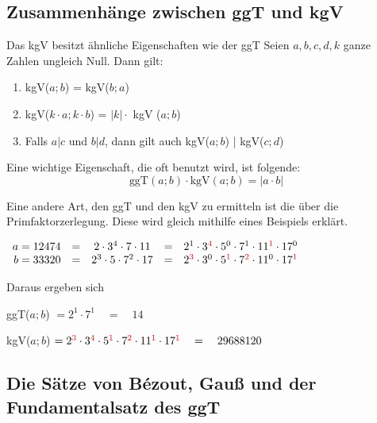 \documentclass[main.tex]{subfiles}
\begin{document}
\subsection{Zusammenhänge zwischen ggT und kgV}


\begin{Theorem}
	Das kgV besitzt ähnliche Eigenschaften wie der ggT
	Seien $a,b,c,d,k$ ganze Zahlen ungleich Null. Dann gilt:
	\begin{enumerate}
		\item kgV($a;b$) = kgV($b;a$)
		\item kgV($k\cdot a ; k \cdot b$) = $|k| \cdot$ kgV ($a;b$)
		\item Falls $a | c$ und $b | d$, dann gilt auch kgV($a;b$) | kgV($c;d$)
	\end{enumerate}

	Eine wichtige Eigenschaft, die oft benutzt wird, ist folgende:
	$$\text{ggT}(a;b) \cdot \text{kgV}(a;b) = |a \cdot b|$$

	Eine andere Art, den ggT und den kgV zu ermitteln ist die über die Primfaktorzerlegung. Diese wird gleich mithilfe eines Beispiels erklärt.
\end{Theorem}

\begin{Beispiel}
	$\begin{array}{rcccl}
		a = 12474 &=& 2 \cdot 3^4 \cdot 7 \cdot 11 &=& 2^1 \cdot 3^{\textcolor{red}{4}} \cdot 5^0 \cdot 7^1 \cdot 11^{\textcolor{red}{1}} \cdot 17^0 \\
		b = 33320 &=& 2^3 \cdot 5 \cdot 7^2 \cdot17 &=& 2^{\textcolor{red}{3}} \cdot 3^0 \cdot 5^{\textcolor{red}{1}} \cdot 7^{\textcolor{red}{2}} \cdot 11^0 \cdot 17^{\textcolor{red}{1}} \\
	\end{array}$
	
	Daraus ergeben sich

	ggT($a;b$) $= 2^1 \cdot 7^1 \quad = \quad 14$

	kgV($a;b$) $= 2^{\textcolor{red}{3}} \cdot 3^{\textcolor{red}{4}} \cdot 5^{\textcolor{red}{1}} \cdot 7^{\textcolor{red}{2}} \cdot 11^{\textcolor{red}{1}} \cdot 17^{\textcolor{red}{1}} \quad = \quad 29688120 $
\end{Beispiel}



\subsection{Die Sätze von Bézout, Gauß und der Fundamentalsatz des ggT}
\end{document}
